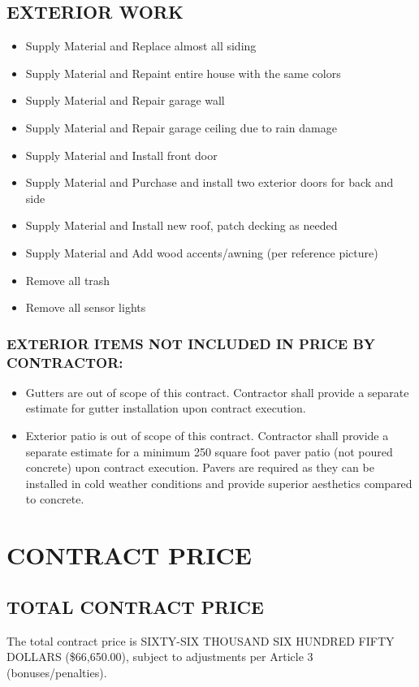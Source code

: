 \documentclass[10pt,letterpaper]{article}
\begin{document}
\subsection{EXTERIOR WORK}
\begin{itemize}[leftmargin=*]
\item Supply Material and Replace almost all siding
\item Supply Material and Repaint entire house with the same colors
\item Supply Material and Repair garage wall
\item Supply Material and Repair garage ceiling due to rain damage
\item Supply Material and Install front door
\item Supply Material and Purchase and install two exterior doors for back and side
\item Supply Material and Install new roof, patch decking as needed
\item Supply Material and Add wood accents/awning (per reference picture)
\item Remove all trash
\item Remove all sensor lights
\end{itemize}

\subsubsection{EXTERIOR ITEMS NOT INCLUDED IN PRICE BY CONTRACTOR:}
\begin{itemize}[leftmargin=*]
\item Gutters are out of scope of this contract. Contractor shall provide a separate estimate for gutter installation upon contract execution.
\item Exterior patio is out of scope of this contract. Contractor shall provide a separate estimate for a minimum 250 square foot paver patio (not poured concrete) upon contract execution. Pavers are required as they can be installed in cold weather conditions and provide superior aesthetics compared to concrete.
\end{itemize}

\section{CONTRACT PRICE}

\subsection{TOTAL CONTRACT PRICE}
The total contract price is SIXTY-SIX THOUSAND SIX HUNDRED FIFTY DOLLARS (\$66,650.00), subject to adjustments per Article 3 (bonuses/penalties).
\end{document}
